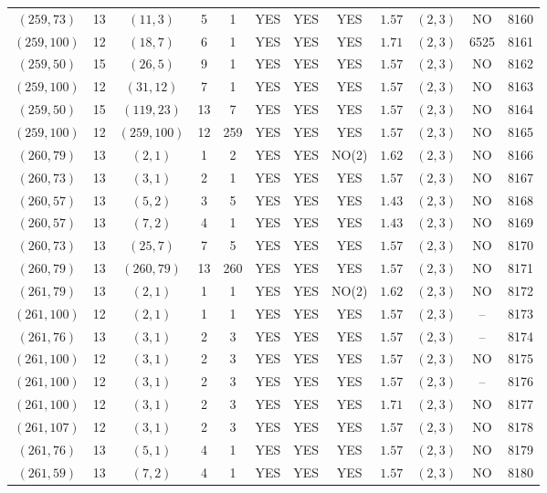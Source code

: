 \begin{longtable}{|c|c|c|c|c|c|c|c|c|c|c|c|}
$(259,73)$ & 13 & $(11,3)$ & 5 & 1 & YES & YES & YES & $1.57$ & $(2,3)$ & NO & 8160\\
$(259,100)$ & 12 & $(18,7)$ & 6 & 1 & YES & YES & YES & $1.71$ & $(2,3)$ & 6525 & 8161\\
$(259,50)$ & 15 & $(26,5)$ & 9 & 1 & YES & YES & YES & $1.57$ & $(2,3)$ & NO & 8162\\
$(259,100)$ & 12 & $(31,12)$ & 7 & 1 & YES & YES & YES & $1.57$ & $(2,3)$ & NO & 8163\\
$(259,50)$ & 15 & $(119,23)$ & 13 & 7 & YES & YES & YES & $1.57$ & $(2,3)$ & NO & 8164\\
$(259,100)$ & 12 & $(259,100)$ & 12 & 259 & YES & YES & YES & $1.57$ & $(2,3)$ & NO & 8165\\
$(260,79)$ & 13 & $(2,1)$ & 1 & 2 & YES & YES & NO(2) & $1.62$ & $(2,3)$ & NO & 8166\\
$(260,73)$ & 13 & $(3,1)$ & 2 & 1 & YES & YES & YES & $1.57$ & $(2,3)$ & NO & 8167\\
$(260,57)$ & 13 & $(5,2)$ & 3 & 5 & YES & YES & YES & $1.43$ & $(2,3)$ & NO & 8168\\
$(260,57)$ & 13 & $(7,2)$ & 4 & 1 & YES & YES & YES & $1.43$ & $(2,3)$ & NO & 8169\\
$(260,73)$ & 13 & $(25,7)$ & 7 & 5 & YES & YES & YES & $1.57$ & $(2,3)$ & NO & 8170\\
$(260,79)$ & 13 & $(260,79)$ & 13 & 260 & YES & YES & YES & $1.57$ & $(2,3)$ & NO & 8171\\
$(261,79)$ & 13 & $(2,1)$ & 1 & 1 & YES & YES & NO(2) & $1.62$ & $(2,3)$ & NO & 8172\\
$(261,100)$ & 12 & $(2,1)$ & 1 & 1 & YES & YES & YES & $1.57$ & $(2,3)$ & -- & 8173\\
$(261,76)$ & 13 & $(3,1)$ & 2 & 3 & YES & YES & YES & $1.57$ & $(2,3)$ & -- & 8174\\
$(261,100)$ & 12 & $(3,1)$ & 2 & 3 & YES & YES & YES & $1.57$ & $(2,3)$ & NO & 8175\\
$(261,100)$ & 12 & $(3,1)$ & 2 & 3 & YES & YES & YES & $1.57$ & $(2,3)$ & -- & 8176\\
$(261,100)$ & 12 & $(3,1)$ & 2 & 3 & YES & YES & YES & $1.71$ & $(2,3)$ & NO & 8177\\
$(261,107)$ & 12 & $(3,1)$ & 2 & 3 & YES & YES & YES & $1.57$ & $(2,3)$ & NO & 8178\\
$(261,76)$ & 13 & $(5,1)$ & 4 & 1 & YES & YES & YES & $1.57$ & $(2,3)$ & NO & 8179\\
$(261,59)$ & 13 & $(7,2)$ & 4 & 1 & YES & YES & YES & $1.57$ & $(2,3)$ & NO & 8180\\

\end{longtable}
